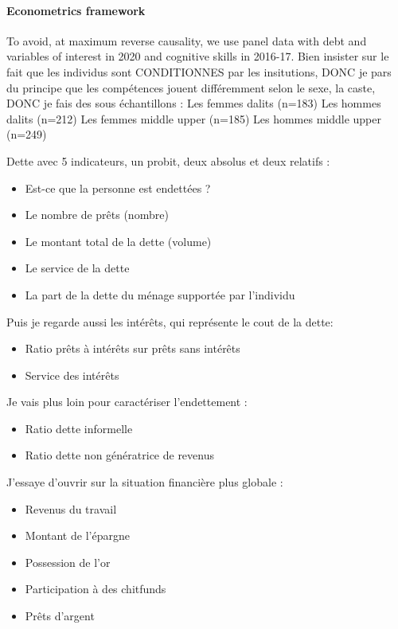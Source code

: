 \documentclass[a4paper, 11pt, onecolumn]{article}
\begin{document}
\paragraph{Econometrics framework}
To avoid, at maximum reverse causality, we use panel data with debt and variables of interest in 2020 and cognitive skills in 2016-17.
Bien insister sur le fait que les individus sont CONDITIONNES par les insitutions, DONC je pars du principe que les compétences jouent différemment selon le sexe, la caste, DONC je fais des sous échantillons :
Les femmes dalits (n=183)
Les hommes dalits (n=212)
Les femmes middle upper (n=185)
Les hommes middle upper (n=249)

Dette avec 5 indicateurs, un probit, deux absolus et deux relatifs :
\begin{itemize}
\item Est-ce que la personne est endettées ?
\item Le nombre de prêts (nombre)
\item Le montant total de la dette (volume)
\item Le service de la dette
\item La part de la dette du ménage supportée par l'individu
\end{itemize}

Puis je regarde aussi les intérêts, qui représente le cout de la dette:
\begin{itemize}
\item Ratio prêts à intérêts sur prêts sans intérêts 
\item Service des intérêts
\end{itemize}

Je vais plus loin pour caractériser l'endettement :
\begin{itemize}
\item Ratio dette informelle
\item Ratio dette non génératrice de revenus
\end{itemize}

J'essaye d'ouvrir sur la situation financière plus globale :
\begin{itemize}
\item Revenus du travail
\item Montant de l'épargne
\item Possession de l'or
\item Participation à des chitfunds
\item Prêts d'argent
\end{itemize}
\end{document}
